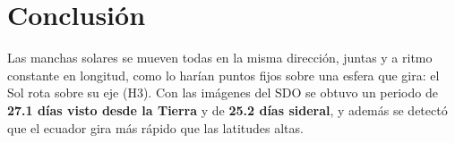 \documentclass[11pt,a4paper]{article}
\begin{document}
\section*{Conclusión}
Las manchas solares se mueven todas en la misma dirección, juntas y a ritmo constante en longitud, como lo harían puntos fijos sobre una
esfera que gira: el Sol rota sobre su eje (H3). Con las imágenes del SDO se obtuvo un periodo de \textbf{27.1 días visto desde la Tierra}
y de \textbf{25.2 días sideral}, y además se detectó que el ecuador gira más rápido que las latitudes altas.
\end{document}
